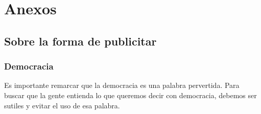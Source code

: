 \documentclass[10pt,letterpaper,oneside]{book}
\begin{document}
\chapter{Anexos}
	\section{Sobre la forma de publicitar} 
	\subsection{Democracia} Es importante remarcar que la democracia es una palabra pervertida. Para buscar que la gente entienda lo que queremos decir con democracia, debemos ser sutiles y evitar el uso de esa palabra.




\end{document}
